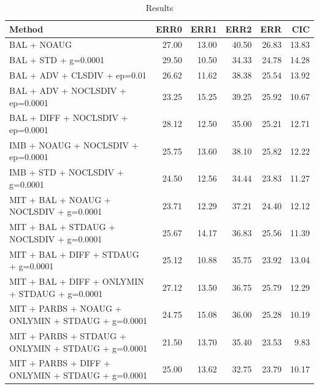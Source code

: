 \begin{table}
\caption{Results}
\label{tab:Results}
\begin{tabular}{lrrrrr}
\toprule
Method & ERR0 & ERR1 & ERR2 & ERR & CIC \\
\midrule
BAL + NOAUG & 27.00 & 13.00 & 40.50 & 26.83 & 13.83 \\
BAL + STD + g=0.0001 & 29.50 & 10.50 & 34.33 & 24.78 & 14.28 \\
BAL + ADV + CLSDIV + ep=0.01 & 26.62 & 11.62 & 38.38 & 25.54 & 13.92 \\
BAL + ADV + NOCLSDIV + ep=0.0001 & 23.25 & 15.25 & 39.25 & 25.92 & 10.67 \\
BAL + DIFF + NOCLSDIV + ep=0.0001 & 28.12 & 12.50 & 35.00 & 25.21 & 12.71 \\
IMB + NOAUG + NOCLSDIV + ep=0.0001 & 25.75 & 13.60 & 38.10 & 25.82 & 12.22 \\
IMB + STD + NOCLSDIV + g=0.0001 & 24.50 & 12.56 & 34.44 & 23.83 & 11.27 \\
MIT + BAL + NOAUG + NOCLSDIV + g=0.0001 & 23.71 & 12.29 & 37.21 & 24.40 & 12.12 \\
MIT + BAL + STDAUG + NOCLSDIV + g=0.0001 & 25.67 & 14.17 & 36.83 & 25.56 & 11.39 \\
MIT + BAL + DIFF + STDAUG + g=0.0001 & 25.12 & 10.88 & 35.75 & 23.92 & 13.04 \\
MIT + BAL + DIFF + ONLYMIN + STDAUG + g=0.0001 & 27.12 & 13.50 & 36.75 & 25.79 & 12.29 \\
MIT + PARBS + NOAUG + ONLYMIN + STDAUG + g=0.0001 & 24.75 & 15.08 & 36.00 & 25.28 & 10.19 \\
MIT + PARBS + STDAUG + ONLYMIN + STDAUG + g=0.0001 & 21.50 & 13.70 & 35.40 & 23.53 & 9.83 \\
MIT + PARBS + DIFF + ONLYMIN + STDAUG + g=0.0001 & 25.00 & 13.62 & 32.75 & 23.79 & 10.17 \\
\bottomrule
\end{tabular}
\end{table}
